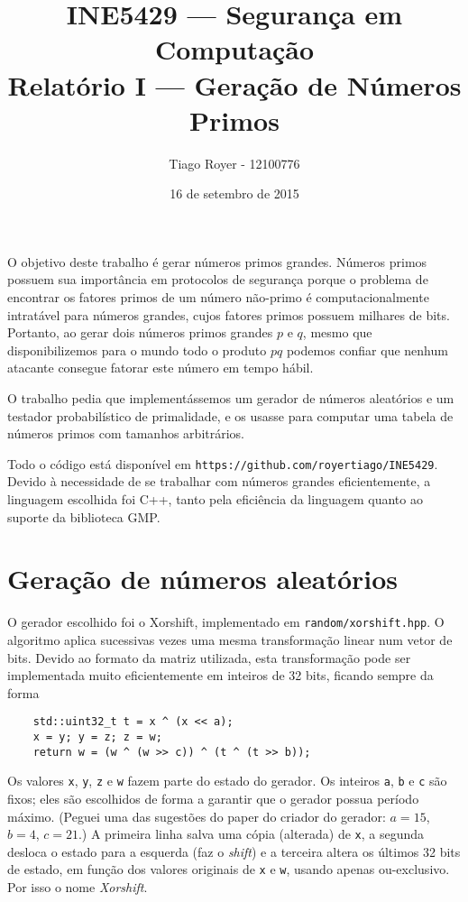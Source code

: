 \documentclass{article}
\title{
    INE5429 --- Segurança em Computação \\
    Relatório I --- Geração de Números Primos
}
\author{
    Tiago Royer - 12100776
}
\date{16 de setembro de 2015}
\begin{document}
\maketitle

O objetivo deste trabalho é gerar números primos grandes.
Números primos possuem sua importância em protocolos de segurança
porque o problema de encontrar os fatores primos de um número não-primo
é computacionalmente intratável para números grandes,
cujos fatores primos possuem milhares de bits.
Portanto, ao gerar dois números primos grandes $p$ e $q$,
mesmo que disponibilizemos para o mundo todo o produto $pq$
podemos confiar que nenhum atacante consegue fatorar este número em tempo hábil.

O trabalho pedia que implementássemos um gerador de números aleatórios
e um testador probabilístico de primalidade,
e os usasse para computar uma tabela de números primos com tamanhos arbitrários.

Todo o código está disponível em \verb"https://github.com/royertiago/INE5429".
Devido à necessidade de se trabalhar com números grandes eficientemente,
a linguagem escolhida foi C++,
tanto pela eficiência da linguagem quanto ao suporte da biblioteca GMP.

\section{Geração de números aleatórios}

O gerador escolhido foi o Xorshift,
implementado em \verb"random/xorshift.hpp".
O algoritmo aplica sucessivas vezes uma mesma transformação linear
num vetor de bits.
Devido ao formato da matriz utilizada,
esta transformação pode ser implementada muito eficientemente em inteiros de 32 bits,
ficando sempre da forma
\begin{verbatim}
    std::uint32_t t = x ^ (x << a);
    x = y; y = z; z = w;
    return w = (w ^ (w >> c)) ^ (t ^ (t >> b));
\end{verbatim}
Os valores \verb"x", \verb"y", \verb"z" e \verb"w" fazem parte do estado do gerador.
Os inteiros \verb"a", \verb"b" e \verb"c" são fixos;
eles são escolhidos de forma a garantir que o gerador possua período máximo.
(Peguei uma das sugestões do paper do criador do gerador: $a = 15$,
$b = 4$, $c = 21$.)
A primeira linha salva uma cópia (alterada) de \verb"x",
a segunda desloca o estado para a esquerda (faz o \emph{shift})
e a terceira altera os últimos 32 bits de estado,
em função dos valores originais de \verb"x" e \verb"w",
usando apenas ou-exclusivo.
Por isso o nome \emph{Xorshift}.
\end{document}
